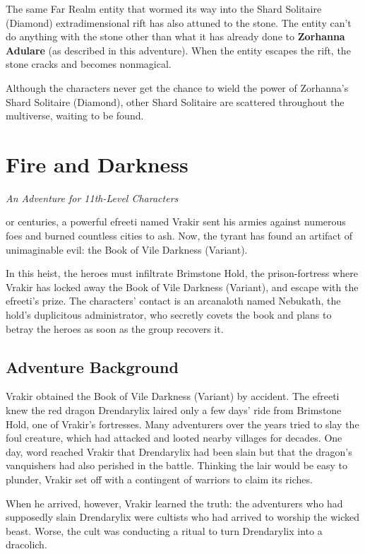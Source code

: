 \documentclass[10pt,a4paper,twoside,bg=print,twocolumn,openany,nodeprecatedcode]{dndbook}
\begin{document}
The same Far Realm entity that wormed its way into the Shard Solitaire (Diamond) extradimensional rift has also attuned to the stone. The entity can't do anything with the stone other than what it has already done to \textbf{Zorhanna Adulare} (as described in this adventure). When the entity escapes the rift, the stone cracks and becomes nonmagical.

Although the characters never get the chance to wield the power of Zorhanna's Shard Solitaire (Diamond), other Shard Solitaire are scattered throughout the multiverse, waiting to be found.

\chapter{Fire and Darkness}
\textit{An Adventure for 11th-Level Characters}

or centuries, a powerful efreeti named Vrakir sent his armies against numerous foes and burned countless cities to ash. Now, the tyrant has found an artifact of unimaginable evil: the Book of Vile Darkness (Variant).


In this heist, the heroes must infiltrate Brimstone Hold, the prison-fortress where Vrakir has locked away the Book of Vile Darkness (Variant), and escape with the efreeti's prize. The characters' contact is an arcanaloth named Nebukath, the hold's duplicitous administrator, who secretly covets the book and plans to betray the heroes as soon as the group recovers it.

\section{Adventure Background}
Vrakir obtained the Book of Vile Darkness (Variant) by accident. The efreeti knew the red dragon Drendarylix laired only a few days' ride from Brimstone Hold, one of Vrakir's fortresses. Many adventurers over the years tried to slay the foul creature, which had attacked and looted nearby villages for decades. One day, word reached Vrakir that Drendarylix had been slain but that the dragon's vanquishers had also perished in the battle. Thinking the lair would be easy to plunder, Vrakir set off with a contingent of warriors to claim its riches.

When he arrived, however, Vrakir learned the truth: the adventurers who had supposedly slain Drendarylix were cultists who had arrived to worship the wicked beast. Worse, the cult was conducting a ritual to turn Drendarylix into a dracolich.
\end{document}
